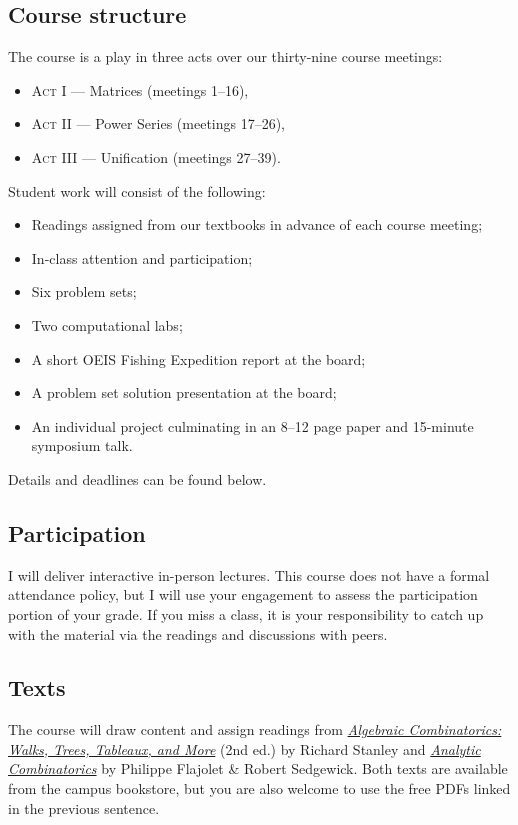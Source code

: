 \documentclass[11pt,twoside]{amsart}
\begin{document}
\subsection*{Course structure}
The course is a play in three acts over our thirty-nine course meetings:
\begin{itemize}
  \item \textsc{Act I} --- Matrices (meetings 1--16),
  \item \textsc{Act II} --- Power Series (meetings 17--26),
  \item \textsc{Act III} --- Unification (meetings 27--39).
\end{itemize}
Student work will consist of the following:
\begin{itemize}
  \item Readings assigned from our textbooks in advance of each course meeting;
  \item In-class attention and participation;
  \item Six problem sets;
  \item Two computational labs;
  \item A short OEIS Fishing Expedition report at the board;
  \item A problem set solution presentation at the board;
  \item An individual project culminating in an 8--12 page paper and 15-minute symposium talk.
\end{itemize}
Details and deadlines can be found below.

\subsection*{Participation}
I will deliver interactive in-person lectures. This course does not have a formal attendance policy, but I will use your engagement to assess the participation portion of your grade. If you miss a class, it is your responsibility to catch up with the material via the readings and discussions with peers.

\subsection*{Texts}
The course will draw content and assign readings from \href{https://link-springer-com.reed.idm.oclc.org/book/10.1007/978-3-319-77173-1}{\emph{Algebraic Combinatorics: Walks, Trees, Tableaux, and More}} (2nd ed.) by Richard Stanley and \href{https://ac.cs.princeton.edu/home/AC.pdf}{\emph{Analytic Combinatorics}} by Philippe Flajolet \& Robert Sedgewick. Both texts are available from the campus bookstore, but you are also welcome to use the free PDFs linked in the previous sentence.
\end{document}
